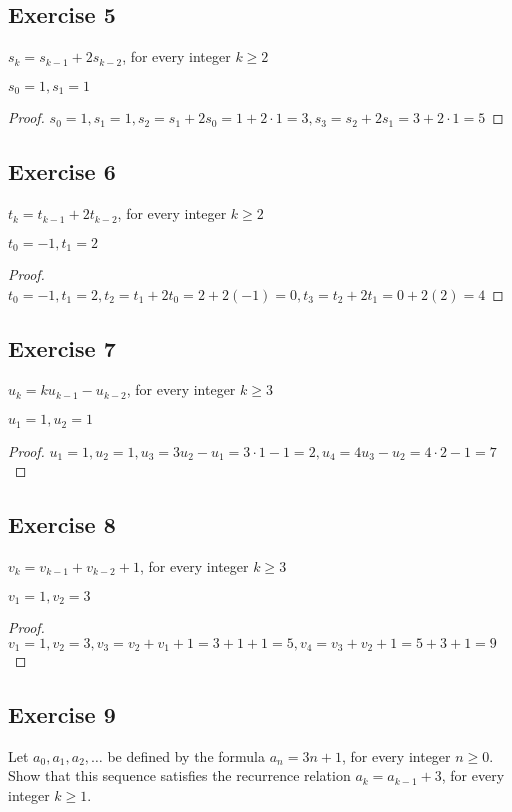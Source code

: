 \documentclass[14pt]{extarticle}
\begin{document}
\subsection{Exercise 5}
$s_k = s_{k - 1} + 2s_{k - 2}$, for every integer $k \geq 2$

$s_0 = 1, s_1 = 1$

\begin{proof}
    $s_0 = 1, s_1 = 1, s_2 = s_1 + 2s_0 = 1 + 2\cdot 1 = 3, s_3 = s_2 + 2s_1 = 3 + 2\cdot 1 = 5$
\end{proof}

\subsection{Exercise 6}
$t_k = t_{k - 1} + 2t_{k - 2}$, for every integer $k \geq 2$

$t_0 = -1, t_1 = 2$

\begin{proof}
    $t_0 = -1, t_1 = 2, t_2 = t_1 + 2t_0 = 2 + 2(-1) = 0, t_3 = t_2 + 2t_1 = 0 + 2(2) = 4$
\end{proof}

\subsection{Exercise 7}
$u_k = ku_{k - 1} - u_{k - 2}$, for every integer $k \geq 3$

$u_1 = 1, u_2 = 1$

\begin{proof}
    $u_1 = 1, u_2 = 1, u_3 = 3u_2 - u_1 = 3 \cdot 1 - 1 = 2, u_4 = 4u_3 - u_2 = 4 \cdot 2 - 1 = 7$
\end{proof}

\subsection{Exercise 8}
$v_k = v_{k-1} + v_{k-2} + 1$, for every integer $k \geq 3$

$v_1 = 1, v_2 = 3$

\begin{proof}
    $v_1 = 1, v_2 = 3, v_3 = v_2 + v_1 + 1 = 3 + 1 + 1 = 5, v_4 = v_3 + v_2 + 1 = 5 + 3 + 1 = 9$
\end{proof}

\subsection{Exercise 9}
Let $a_0, a_1, a_2, \ldots$ be defined by the formula $a_n = 3n + 1$, for every integer $n \geq 0$. Show that this
sequence satisfies the recurrence relation $a_k = a_{k - 1} + 3$, for every integer $k \geq 1$.
\end{document}
